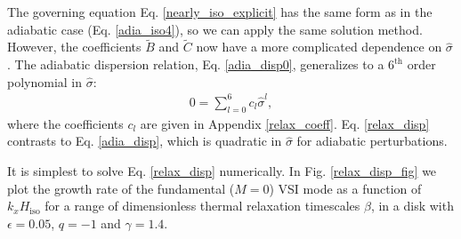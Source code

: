 The governing equation Eq. \ref{nearly_iso_explicit} has the same form
as in the adiabatic case (Eq. \ref{adia_iso4}), so we can apply the
same solution method. However, the coefficients
$\widetilde{B}$ and $\widetilde{C}$ now have a more complicated
dependence on $\hat{\sigma}$.  The adiabatic dispersion relation,
Eq. \ref{adia_disp0}, generalizes to a $6^\mathrm{th}$ order
polynomial in $\hat{\sigma}$:
\begin{align}
  0 = \sum_{l=0}^{6}c_l\hat{\sigma}^l,\label{relax_disp}
\end{align}
where the coefficients $c_l$ are given in Appendix \ref{relax_coeff}.
Eq. \ref{relax_disp} contrasts to Eq. \ref{adia_disp}, which is
quadratic in $\hat{\sigma}$ for adiabatic perturbations. 

It is simplest to solve Eq. \ref{relax_disp} numerically. In
Fig. \ref{relax_disp_fig} we plot the growth rate of the fundamental
($M=0$) VSI mode as a function of $k_xH_\mathrm{iso}$ for a range of
dimensionless thermal relaxation timescales $\beta$, in a disk with
$\epsilon=0.05$, $q=-1$ and $\gamma=1.4$. 



